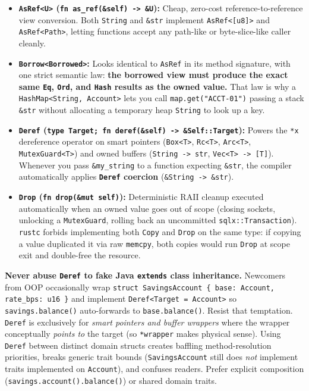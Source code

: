 \begin{itemize}
  \item \textbf{\texttt{AsRef<U>} (\texttt{fn as\_ref(\&self) -> \&U}):} Cheap, zero-cost reference-to-reference view conversion. Both \texttt{String} and \texttt{\&str} implement \texttt{AsRef<[u8]>} and \texttt{AsRef<Path>}, letting functions accept any path-like or byte-slice-like caller cleanly.
  \item \textbf{\texttt{Borrow<Borrowed>}:} Looks identical to \texttt{AsRef} in its method signature, with one strict semantic law: \textbf{the borrowed view must produce the exact same \texttt{Eq}, \texttt{Ord}, and \texttt{Hash} results as the owned value.} That law is why a \texttt{HashMap<String, Account>} lets you call \texttt{map.get("ACCT-01")} passing a stack \texttt{\&str} without allocating a temporary heap \texttt{String} to look up a key.
  \item \textbf{\texttt{Deref} (\texttt{type Target; fn deref(\&self) -> \&Self::Target}):} Powers the \texttt{*x} dereference operator on smart pointers (\texttt{Box<T>}, \texttt{Rc<T>}, \texttt{Arc<T>}, \texttt{MutexGuard<T>}) and owned buffers (\texttt{String -> str}, \texttt{Vec<T> -> [T]}). Whenever you pass \texttt{\&my\_string} to a function expecting \texttt{\&str}, the compiler automatically applies \textbf{\texttt{Deref} coercion} (\texttt{\&String -> \&str}).
  \item \textbf{\texttt{Drop} (\texttt{fn drop(\&mut self)}):} Deterministic RAII cleanup executed automatically when an owned value goes out of scope (closing sockets, unlocking a \texttt{MutexGuard}, rolling back an uncommitted \texttt{sqlx::Transaction}). \texttt{rustc} forbids implementing both \texttt{Copy} and \texttt{Drop} on the same type: if copying a value duplicated it via raw \texttt{memcpy}, both copies would run \texttt{Drop} at scope exit and double-free the resource.
\end{itemize}

\begin{trapbox}
\textbf{Never abuse \texttt{Deref} to fake Java \texttt{extends} class inheritance.} Newcomers from OOP occasionally wrap \texttt{struct SavingsAccount \{ base: Account, rate\_bps: u16 \}} and implement \texttt{Deref<Target = Account>} so \texttt{savings.balance()} auto-forwards to \texttt{base.balance()}. Resist that temptation. \texttt{Deref} is exclusively for \emph{smart pointers and buffer wrappers} where the wrapper conceptually \emph{points to} the target (so \texttt{*wrapper} makes physical sense). Using \texttt{Deref} between distinct domain structs creates baffling method-resolution priorities, breaks generic trait bounds (\texttt{SavingsAccount} still does \emph{not} implement traits implemented on \texttt{Account}), and confuses readers. Prefer explicit composition (\texttt{savings.account().balance()}) or shared domain traits.
\end{trapbox}

